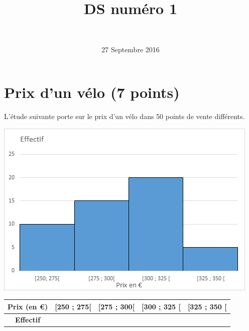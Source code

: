 \documentclass[a4paper,11pt]{exam}
\author{\ }
\date{27 Septembre 2016}
\title{DS num\'ero 1}
\begin{document}
%	

	\maketitle
\section{Prix d'un vélo (7 points)}
	
	
	L'étude suivante porte sur le prix d'un vélo dans 50 points de vente différents.
	
	\begin{center}
		\includegraphics[scale=0.55]{./histo}
	\end{center}
		
		
				
		\begin{table}[h]
			\centering
			\label{my-label}
			\begin{tabular}{|@{\ }c@{\ }|@{\ }c@{\ }|@{\ }c@{\ }|@{\ }c@{\ }|@{\ }c@{\ }|}
				\hline
				\textbf{Prix} (en €) & [250 ; 275[ & [275 ; 300[ & [300 ; 325 [  & [325 ; 350 [\\
				\hline
				\textbf{Effectif} &  &  &  & \\
				\hline 
			\end{tabular}
		\end{table}
	
	
		
		
\end{document}
